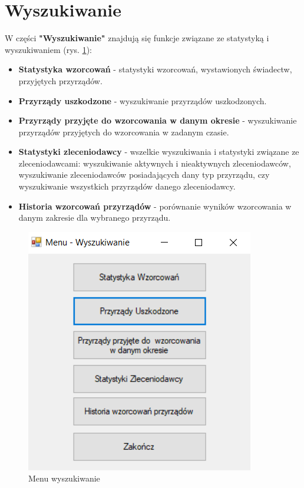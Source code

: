 
\rozdzial

\section{Wyszukiwanie}
\label{wyszukiwanie}

W części \textbf{"Wyszukiwanie"} znajdują się funkcje związane ze statystyką i wyszukiwaniem (rys. \ref{menuWyszukiwanie}):
\begin{itemize}
	\item \textbf{Statystyka wzorcowań} - statystyki wzorcowań, wystawionych świadectw, przyjętych przyrządów.
	\item \textbf{Przyrządy uszkodzone} - wyszukiwanie przyrządów uszkodzonych.
	\item \textbf{Przyrządy przyjęte do wzorcowania w danym okresie} - wyszukiwanie przyrządów przyjętych do wzorcowania w zadanym czasie.
	\item  \textbf{Statystyki zleceniodawcy} - wszelkie wyszukiwania i statystyki związane ze zleceniodawcami: wyszukiwanie aktywnych i nieaktywnych zleceniodawców, wyszukiwanie zleceniodawców posiadających dany typ przyrządu, czy wyszukiwanie wszystkich przyrządów danego zleceniodawcy.
	\item \textbf{Historia wzorcowań przyrządów} - porównanie wyników wzorcowania w danym zakresie dla wybranego przyrządu.
\end{itemize}



\begin{figure}[htb]
	\centering
	\includegraphics{obrazki/Wyszukiwanie/menu_wyszukiwanie.png}
	\caption{Menu wyszukiwanie}
	\label{menuWyszukiwanie}
\end{figure}

